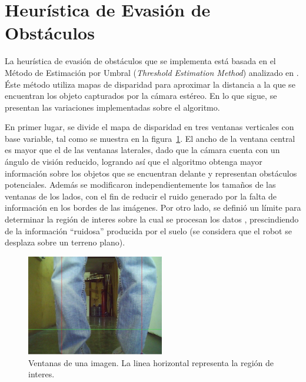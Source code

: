 \documentclass[journal]{IEEEtran}
\begin{document}
\section{Heur\'istica de Evasi\'on de Obst\'aculos}
\label{sec:heuristica}

La heur\'istica de evasi\'on de obst\'aculos que se implementa est\'a basada en el M\'etodo de Estimaci\'on por Umbral (\emph{Threshold Estimation Method}) analizado en \cite{KNG10}. \'Este m\'etodo utiliza mapas de disparidad para aproximar la distancia a la que se encuentran los objeto capturados por la c\'amara est\'ereo. En lo que sigue, se presentan las variaciones implementadas sobre el algoritmo.

En primer lugar, se divide el mapa de disparidad en tres ventanas verticales con base variable, tal como se muestra en la figura~\ref{fig:piernas_cerca}. El ancho de la ventana central es mayor que el de las ventanas laterales, dado que la c\'amara cuenta con un \'angulo de visi\'on reducido, logrando as\'i que el algoritmo obtenga mayor informaci\'on sobre los objetos que se encuentran delante y representan obst\'aculos potenciales. Adem\'as se modificaron independientemente los tama\~nos de las ventanas de los lados, con el fin de reducir el ruido generado por la falta de informaci\'on en los bordes de las im\'agenes. Por otro lado, se defini\'o un l\'imite para determinar la regi\'on de interes sobre la cual se procesan los datos \cite{H09}, prescindiendo de la informaci\'on ``ruidosa'' producida por el suelo (se considera que el robot se desplaza sobre un terreno plano).

\begin{figure}[ht]
	\begin{center}
		\includegraphics[width=6cm]{./images/piernas_cerca.jpg}
	\end{center}
	\caption{Ventanas de una imagen. La linea horizontal representa la regi\'on de interes.}
	\label{fig:piernas_cerca}
\end{figure}
\end{document}
